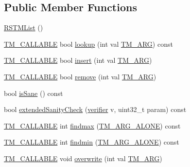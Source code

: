 \subsection*{Public Member Functions}
\begin{DoxyCompactItemize}
\item 
\hyperlink{classRSTMList_a18dea60bfc63edcc3a7e293ff1cd558a}{R\-S\-T\-M\-List} ()
\item 
\hyperlink{tm_8h_adf0341d9b0d169f1aba20257caed702e}{T\-M\-\_\-\-C\-A\-L\-L\-A\-B\-L\-E} bool \hyperlink{classRSTMList_a173c9bd9bd61008a21ec0f2975ee5c07}{lookup} (int val \hyperlink{tm_8h_a030f4350a175fed7a99c242cbaa53258}{T\-M\-\_\-\-A\-R\-G}) const 
\item 
\hyperlink{tm_8h_adf0341d9b0d169f1aba20257caed702e}{T\-M\-\_\-\-C\-A\-L\-L\-A\-B\-L\-E} bool \hyperlink{classRSTMList_aa0daabc69fa98a2fd3d57751133dd85b}{insert} (int val \hyperlink{tm_8h_a030f4350a175fed7a99c242cbaa53258}{T\-M\-\_\-\-A\-R\-G})
\item 
\hyperlink{tm_8h_adf0341d9b0d169f1aba20257caed702e}{T\-M\-\_\-\-C\-A\-L\-L\-A\-B\-L\-E} bool \hyperlink{classRSTMList_aa94514fee852bb8b03e28a8622b7e544}{remove} (int val \hyperlink{tm_8h_a030f4350a175fed7a99c242cbaa53258}{T\-M\-\_\-\-A\-R\-G})
\item 
bool \hyperlink{classRSTMList_a1ab24887f316aca1a3e695a89e943646}{is\-Sane} () const 
\item 
bool \hyperlink{classRSTMList_aa9b1536526cca34b2f811c43489f15d9}{extended\-Sanity\-Check} (\hyperlink{List_8hpp_a0b34b0d5aa05650e72ff076ac10580ad}{verifier} v, uint32\-\_\-t param) const 
\item 
\hyperlink{tm_8h_adf0341d9b0d169f1aba20257caed702e}{T\-M\-\_\-\-C\-A\-L\-L\-A\-B\-L\-E} int \hyperlink{classRSTMList_afa1ace992cc78ea607cfc749d7e9fd45}{findmax} (\hyperlink{tm_8h_a5f5ab8a008b9734c5378be81bcb3639e}{T\-M\-\_\-\-A\-R\-G\-\_\-\-A\-L\-O\-N\-E}) const 
\item 
\hyperlink{tm_8h_adf0341d9b0d169f1aba20257caed702e}{T\-M\-\_\-\-C\-A\-L\-L\-A\-B\-L\-E} int \hyperlink{classRSTMList_a1978ce6001a749e794b7e13c40b51e64}{findmin} (\hyperlink{tm_8h_a5f5ab8a008b9734c5378be81bcb3639e}{T\-M\-\_\-\-A\-R\-G\-\_\-\-A\-L\-O\-N\-E}) const 
\item 
\hyperlink{tm_8h_adf0341d9b0d169f1aba20257caed702e}{T\-M\-\_\-\-C\-A\-L\-L\-A\-B\-L\-E} void \hyperlink{classRSTMList_a4836859ea0ceaadfc1e7028548f2b27d}{overwrite} (int val \hyperlink{tm_8h_a030f4350a175fed7a99c242cbaa53258}{T\-M\-\_\-\-A\-R\-G})
\end{DoxyCompactItemize}
